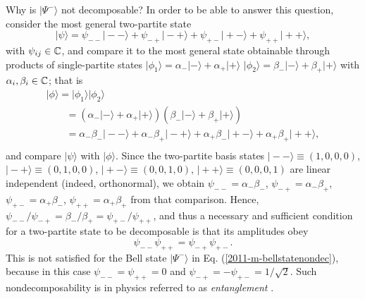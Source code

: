 {Why is $\vert \Psi^-\rangle$ not decomposable?
In order to be able to answer this question, consider
the most general two-partite state
\begin{equation}
\vert \psi \rangle
=
\psi_{--}\vert -- \rangle
+
\psi_{-+}\vert -+ \rangle
+
\psi_{+-}\vert +- \rangle
+
\psi_{++}\vert ++ \rangle
,
\end{equation}
with $\psi_{ij}\in {\Bbb C}$,
and compare it to the most general state obtainable through products of single-partite states
$\vert \phi_1\rangle  = \alpha_-  \vert - \rangle    + \alpha_+  \vert + \rangle$
$\vert \phi_2\rangle  = \beta_-  \vert - \rangle    + \beta_+  \vert + \rangle$
with $\alpha_{i}, \beta_i \in {\Bbb C}$;
that is
\begin{equation}
\begin{array}{l}
\vert \phi \rangle  =\vert \phi_1\rangle    \vert \phi_2\rangle   \\
\qquad =
(\alpha_-  \vert - \rangle    + \alpha_+  \vert + \rangle )
(\beta_-  \vert - \rangle    + \beta_+  \vert + \rangle )   \\
\qquad  =\alpha_- \beta_- \vert -- \rangle    + \alpha_-\beta_+  \vert -+ \rangle +
\alpha_+ \beta_- \vert +- \rangle    + \alpha_+\beta_+  \vert ++ \rangle, \\
\end{array}
\end{equation}
and compare $\vert \psi \rangle  $ with  $\vert \phi \rangle$.
Since the two-partite basis states
$
\vert -- \rangle  \equiv (1,0,0,0)
$, $
\vert -+ \rangle    \equiv (0,1,0,0)
$, $
\vert +- \rangle     \equiv (0,0,1,0)
$, $
\vert ++ \rangle      \equiv (0,0,0,1)
$
are linear independent (indeed, orthonormal), we obtain
$
\psi_{--}=  \alpha_- \beta_-
$,
$
\psi_{-+}=   \alpha_-\beta_+
$,
$
\psi_{+-}=  \alpha_+ \beta_-
$,
$
\psi_{++}= \alpha_+\beta_+
$ from that comparison.
Hence,
$\psi_{--}/ \psi_{-+} =   \beta_- / \beta_+ =   \psi_{+-} / \psi_{++}$,
and thus a necessary and sufficient condition for a two-partite state to be decomposable is that its amplitudes obey
 \begin{equation}
\psi_{--}\psi_{++}  =  \psi_{-+}   \psi_{+-} .
\end{equation}
This is not satisfied for the Bell state $\vert \Psi^-\rangle$ in Eq. (\ref{2011-m-bellstatenondec}),
because in this case $\psi_{--}=\psi_{++} =0$
and  $ \psi_{-+} = - \psi_{+-} =1/\sqrt{2}$.
Such nondecomposability is in physics referred to as {\em entanglement}
\cite{CambridgeJournals:1737068,CambridgeJournals:2027212,schrodinger}.

}
